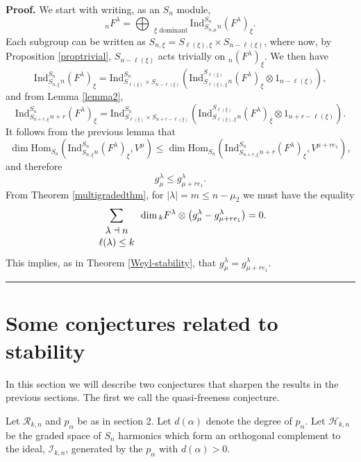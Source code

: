 \documentclass[12pt]{article}%
\newenvironment{proof}[1][Proof]{\noindent\textbf{#1.} }{\ \rule{0.5em}{0.5em}}
\begin{document}
\begin{proof}
We start with writing, as an $S_{n}$ module,
\[
{}_{n} F^{\lambda} = \bigoplus_{\text{ $\xi$ dominant}} \mathrm{Ind}%
_{S_{n,\mu}}^{S_{n}} {}_{n} (F^{\lambda})_{\xi}.
\]
Each subgroup can be written as $S_{n,\xi} = S_{\ell(\xi),\xi} \times
S_{n-\ell(\xi)}$, where now, by Proposition \ref{proptrivial}, $S_{n-\ell
(\xi)}$ acts trivially on ${}_{n} (F^{\lambda})_{\xi}$. We then have
\[
\mathrm{Ind}_{S_{n,\xi}}^{S_{n}} {}_{n} (F^{\lambda})_{\xi}= \mathrm{Ind}%
_{S_{\ell(\xi)} \times S_{n-\ell(\xi)} }^{S_{n}} ( \mathrm{Ind}_{S_{\ell
(\xi),\xi} }^{S_{\ell(\xi)}} {}_{n} (F^{\lambda})_{\xi}\otimes1_{n-\ell(\xi
)}),
\]
and from Lemma \ref{lemma2},
\[
\mathrm{Ind}_{S_{n+r,\xi}}^{S_{n}} {}_{n+r} (F^{\lambda})_{\xi}=
\mathrm{Ind}_{S_{\ell(\xi)} \times S_{n+r-\ell(\xi)} }^{S_{n}}( \mathrm{Ind}%
_{S_{\ell(\xi),\xi} }^{S_{\ell(\xi)}} {}_{n} (F^{\lambda})_{\xi}%
\otimes1_{n+r-\ell(\xi)}).
\]
It follows from the previous lemma that
\[
\dim\mathrm{Hom}_{S_{n}} ( \mathrm{Ind}_{S_{n,\xi}}^{S_{n}} {}_{n}
(F^{\lambda})_{\xi}, V^{\mu}) \leq\dim\mathrm{Hom}_{S_{n}}( \mathrm{Ind}%
_{S_{n+r,\xi}}^{S_{n}} {}_{n+r} (F^{\lambda})_{\xi}, V^{\mu+r e_{1}} ) ,
\]
and therefore
\[
g^{\lambda}_{\mu} \leq g^{\lambda}_{\mu+re_{1}}.
\]
From Theorem \ref{multigradedthm}, for $|\lambda| = m \leq n - \mu_{2}$ we
must have the equality
\[
\sum_{%
\begin{array}
[c]{c}%
\lambda\dashv n\\
\ell(\lambda)\leq k
\end{array}
}\dim{}_{k}F^{\lambda}\otimes\left(  g_{\mu}^{\lambda}-g_{\mu+re_{1}}%
^{\lambda}\right)  =0.
\]
This implies, as in Theorem \ref{Weyl-stability}, that $g_{\mu}^{\lambda} =
g_{\mu+re_{1}}^{\lambda}$.
\end{proof}

\section{Some conjectures related to stability}

In this section we will describe two conjectures that sharpen the results in
the previous sections. The first we call the quasi-freeness conjecture.

Let $\mathcal{R}_{k,n}$ and $p_{\alpha}$ be as in section 2. Let $d(\alpha)$
denote the degree of $p_{\alpha}$. Let $\mathcal{H}_{k,n}$ be the graded space
of $S_{n}$ harmonics which form an orthogonal complement to the ideal,
$\mathcal{I}_{k,n}$, generated by the $p_{\alpha}$ with $d(\alpha)>0.$
\end{document}
